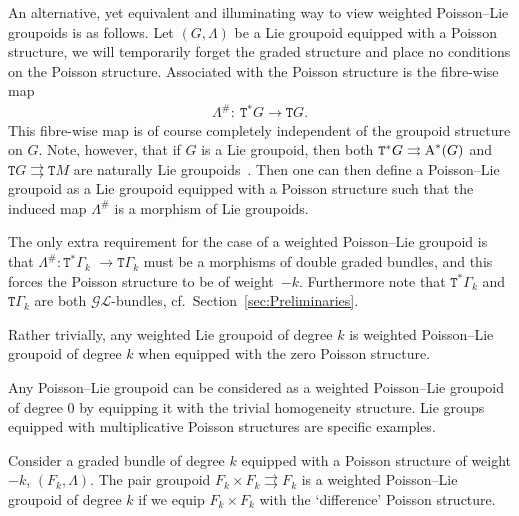 \documentclass[10pt,a4paper]{amsart}
\def\sT{{\mathtt T}}
\numberwithin{equation}{section}
\begin{document}
An alternative, yet equivalent and illuminating way to view weighted Poisson--Lie groupoids is as follows. Let $(G, \Lambda)$ be a Lie groupoid equipped with a Poisson structure, we will temporarily forget the graded structure and place no conditions on the Poisson structure.  Associated with the Poisson structure is the f\/ibre-wise map
\begin{gather*}
\Lambda^{\#}\colon \  \sT^{*}G \rightarrow \sT G.
\end{gather*}
 This f\/ibre-wise map is of course completely independent of the groupoid structure on $G$.
Note, however, that if  $G$ is a Lie groupoid, then both $\sT^{*}G \rightrightarrows \textnormal{A}^{*}(G)$ and $\sT G \rightrightarrows \sT M$ are naturally Lie groupoids~\cite{Mackenzie2005}.  Then one can then def\/ine a Poisson--Lie groupoid as a Lie groupoid equipped with a Poisson structure such that the induced map $\Lambda^{\#}$ is a morphism of Lie groupoids.

The only extra requirement  for the case of a weighted Poisson--Lie groupoid is that $ \Lambda^{\#}\colon \sT^{*}\Gamma_{k}$ $\rightarrow \sT \Gamma_{k}$ must be a morphisms of double graded bundles, and this forces the Poisson structure to be of weight~${-}k$. Furthermore note that $\sT^{*}\Gamma_{k}$ and $\sT \Gamma_{k}$ are both $\mathcal{GL}$-bundles, cf.\ Section~\ref{sec:Preliminaries}.


\begin{Example}
Rather trivially, any weighted Lie groupoid of degree $k$ is weighted Poisson--Lie groupoid of degree $k$ when equipped with the zero Poisson structure.
\end{Example}

\begin{Example}
Any Poisson--Lie groupoid can be considered as a weighted Poisson--Lie groupoid of degree $0$ by equipping it with the trivial homogeneity structure. Lie groups equipped with  multiplicative Poisson structures are specif\/ic examples.
\end{Example}

\begin{Example}
Consider a graded bundle of degree $k$ equipped with a Poisson structure of weight $-k$, $(F_{k}, \Lambda)$. The pair groupoid $F_{k}\times F_{k} \rightrightarrows F_{k}$ is a weighted Poisson--Lie groupoid of degree $k$ if we equip $F_{k}\times F_{k}$ with the `dif\/ference' Poisson structure.
\end{Example}
\end{document}
